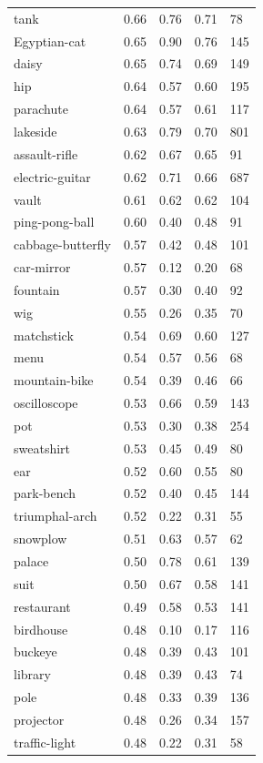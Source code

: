 \begin{center}
\begin{longtable}{lllll}
tank & 0.66 & 0.76 & 0.71 & 78 \\
Egyptian-cat & 0.65 & 0.90 & 0.76 & 145 \\
daisy & 0.65 & 0.74 & 0.69 & 149 \\
hip & 0.64 & 0.57 & 0.60 & 195 \\
parachute & 0.64 & 0.57 & 0.61 & 117 \\
lakeside & 0.63 & 0.79 & 0.70 & 801 \\
assault-rifle & 0.62 & 0.67 & 0.65 & 91 \\
electric-guitar & 0.62 & 0.71 & 0.66 & 687 \\
vault & 0.61 & 0.62 & 0.62 & 104 \\
ping-pong-ball & 0.60 & 0.40 & 0.48 & 91 \\
cabbage-butterfly & 0.57 & 0.42 & 0.48 & 101 \\
car-mirror & 0.57 & 0.12 & 0.20 & 68 \\
fountain & 0.57 & 0.30 & 0.40 & 92 \\
wig & 0.55 & 0.26 & 0.35 & 70 \\
matchstick & 0.54 & 0.69 & 0.60 & 127 \\
menu & 0.54 & 0.57 & 0.56 & 68 \\
mountain-bike & 0.54 & 0.39 & 0.46 & 66 \\
oscilloscope & 0.53 & 0.66 & 0.59 & 143 \\
pot & 0.53 & 0.30 & 0.38 & 254 \\
sweatshirt & 0.53 & 0.45 & 0.49 & 80 \\
ear & 0.52 & 0.60 & 0.55 & 80 \\
park-bench & 0.52 & 0.40 & 0.45 & 144 \\
triumphal-arch & 0.52 & 0.22 & 0.31 & 55 \\
snowplow & 0.51 & 0.63 & 0.57 & 62 \\
palace & 0.50 & 0.78 & 0.61 & 139 \\
suit & 0.50 & 0.67 & 0.58 & 141 \\
restaurant & 0.49 & 0.58 & 0.53 & 141 \\
birdhouse & 0.48 & 0.10 & 0.17 & 116 \\
buckeye & 0.48 & 0.39 & 0.43 & 101 \\
library & 0.48 & 0.39 & 0.43 & 74 \\
pole & 0.48 & 0.33 & 0.39 & 136 \\
projector & 0.48 & 0.26 & 0.34 & 157 \\
traffic-light & 0.48 & 0.22 & 0.31 & 58 \\

\end{longtable}
\end{center}
